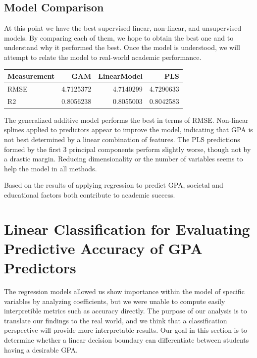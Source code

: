 \documentclass[
]{article}
\begin{document}
\subsection{Model Comparison}\label{model-comparison}

At this point we have the best supervised linear, non-linear, and
unsupervised models. By comparing each of them, we hope to obtain the
best one and to understand why it performed the best. Once the model is
understood, we will attempt to relate the model to real-world academic
performance.

\begin{longtable}[]{@{}lrrr@{}}
\toprule\noalign{}
Measurement & GAM & LinearModel & PLS \\
\midrule\noalign{}
\endhead
\bottomrule\noalign{}
\endlastfoot
RMSE & 4.7125372 & 4.7140299 & 4.7290633 \\
R2 & 0.8056238 & 0.8055003 & 0.8042583 \\
\end{longtable}

The generalized additive model performs the best in terms of RMSE.
Non-linear splines applied to predictors appear to improve the model,
indicating that GPA is not best determined by a linear combination of
features. The PLS predictions formed by the first 3 principal components
perform slightly worse, though not by a drastic margin. Reducing
dimensionality or the number of variables seems to help the model in all
methods.

Based on the results of applying regression to predict GPA, societal and
educational factors both contribute to academic success.

\section{Linear Classification for Evaluating Predictive Accuracy of GPA
Predictors}\label{linear-classification-for-evaluating-predictive-accuracy-of-gpa-predictors}

The regression models allowed us show importance within the model of
specific variables by analyzing coefficients, but we were unable to
compute easily interpretible metrics such as accuracy directly. The
purpose of our analysis is to translate our findings to the real world,
and we think that a classification perspective will provide more
interpretable results. Our goal in this section is to determine whether
a linear decision boundary can differentiate between students having a
desirable GPA.
\end{document}
